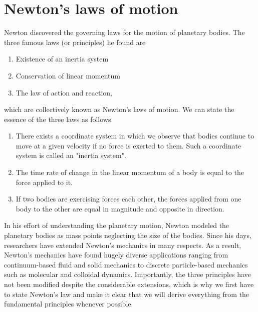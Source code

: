 \documentclass[10pt,a4j]{article}
\begin{document}
\section{Newton's laws of motion}
Newton discovered the governing laws for the motion of planetary bodies. The three famous laws (or principles) he found are  
\begin{enumerate}
    \item Existence of an inertia system
    \item Conservation of linear momentum
    \item The law of action and reaction,
\end{enumerate}
which are collectively known as Newton's laws of motion. We can state the essence of the three laws as follows. 
\begin{enumerate}
\item 
    There exists a coordinate system in which we observe that bodies continue to move at a given velocity if no force is exerted to them. Such a coordinate system is called an "inertia system".
\item
    The time rate of change in the linear momentum of a body is equal to the force applied to it.
\item
    If two bodies are exercising forces each other, the forces applied from one body to the other are equal in magnitude and opposite in direction.
\end{enumerate}
In his effort of understanding the planetary motion, Newton modeled the planetary bodies as mass points neglecting the size of the bodies. Since his days, researchers have extended Newton's mechanics in many respects. As a result, Newton's mechanics have found hugely diverse applications ranging from continuum-based fluid and solid mechanics to discrete particle-based mechanics such as molecular and colloidal dynamics. Importantly, the three principles have not been modified despite the considerable extensions, which is why we first have to state Newton's law and make it clear that we will derive everything from the fundamental principles whenever possible. 
\\
 
\end{document}

